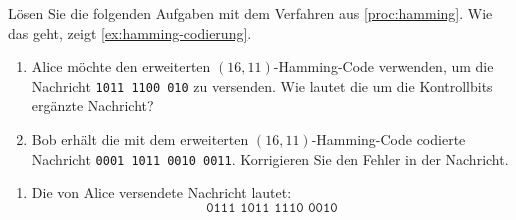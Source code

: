 \begin{myexercise}\label{ex:hamming}
    Lösen Sie die folgenden Aufgaben mit dem Verfahren aus
    \cref{proc:hamming}. Wie das geht, zeigt \cref{ex:hamming-codierung}.

    \begin{enumerate}
        \item Alice möchte den erweiterten \((16,11)\)-Hamming-Code verwenden,
              um die Nachricht \texttt{1011 1100 010} zu versenden.
              Wie lautet die um die Kontrollbits ergänzte Nachricht?

        \item Bob erhält die mit dem erweiterten \((16,11)\)-Hamming-Code
              codierte Nachricht \texttt{0001 1011 0010 0011}.
              Korrigieren Sie den Fehler in der Nachricht.
    \end{enumerate}

    \begin{myanswer}

        \begin{enumerate}
            \item Die von Alice versendete Nachricht lautet:
                  \[
                      \texttt{0111 1011 1110 0010}
                  \]

                  \begin{center}
                  \end{center}


\end{enumerate}
\end{myanswer}
\end{myexercise}

